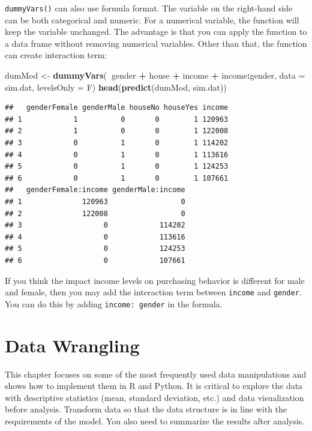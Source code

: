 \documentclass[12pt,]{krantz}
\makeatletter
\newenvironment{Shaded}{\begin{snugshade}}{\end{snugshade}}
\newcommand{\DataTypeTok}[1]{\textcolor[rgb]{0.27,0.27,0.27}{#1}}
\newcommand{\KeywordTok}[1]{\textcolor[rgb]{0.27,0.27,0.27}{\textbf{#1}}}
\newcommand{\NormalTok}[1]{#1}
\newcommand{\OperatorTok}[1]{\textcolor[rgb]{0.43,0.43,0.43}{\textbf{#1}}}
\newcommand{\StringTok}[1]{\textcolor[rgb]{0.5,0.5,0.5}{#1}}
\newenvironment{kframe}{%
\medskip{}
\setlength{\fboxsep}{.8em}
 \def\at@end@of@kframe{}%
 \ifinner\ifhmode%
  \def\at@end@of@kframe{\end{minipage}}%
  \begin{minipage}{\columnwidth}%
 \fi\fi%
 \def\FrameCommand##1{\hskip\@totalleftmargin \hskip-\fboxsep
 \colorbox{shadecolor}{##1}\hskip-\fboxsep
     \hskip-\linewidth \hskip-\@totalleftmargin \hskip\columnwidth}%
 \MakeFramed {\advance\hsize-\width
   \@totalleftmargin\z@ \linewidth\hsize
   \@setminipage}}%
 {\par\unskip\endMakeFramed%
 \at@end@of@kframe}
\renewenvironment{Shaded}{\begin{kframe}}{\end{kframe}}
\makeatother
\begin{document}
\texttt{dummyVars()} can also use formula format. The variable on the right-hand side can be both categorical and numeric. For a numerical variable, the function will keep the variable unchanged. The advantage is that you can apply the function to a data frame without removing numerical variables. Other than that, the function can create interaction term:

\begin{Shaded}
\begin{Highlighting}[]
\NormalTok{dumMod <-}\StringTok{ }\KeywordTok{dummyVars}\NormalTok{(}\OperatorTok{~}\NormalTok{gender }\OperatorTok{+}\StringTok{ }\NormalTok{house }\OperatorTok{+}\StringTok{ }\NormalTok{income }\OperatorTok{+}\StringTok{ }\NormalTok{income}\OperatorTok{:}\NormalTok{gender, }
                    \DataTypeTok{data =}\NormalTok{ sim.dat, }
                    \DataTypeTok{levelsOnly =}\NormalTok{ F)}
\KeywordTok{head}\NormalTok{(}\KeywordTok{predict}\NormalTok{(dumMod, sim.dat))}
\end{Highlighting}
\end{Shaded}

\begin{verbatim}
##   genderFemale genderMale houseNo houseYes income
## 1            1          0       0        1 120963
## 2            1          0       0        1 122008
## 3            0          1       0        1 114202
## 4            0          1       0        1 113616
## 5            0          1       0        1 124253
## 6            0          1       0        1 107661
##   genderFemale:income genderMale:income
## 1              120963                 0
## 2              122008                 0
## 3                   0            114202
## 4                   0            113616
## 5                   0            124253
## 6                   0            107661
\end{verbatim}

If you think the impact income levels on purchasing behavior is different for male and female, then you may add the interaction term between \texttt{income} and \texttt{gender}. You can do this by adding \texttt{income:\ gender} in the formula.

\hypertarget{data-wrangling}{%
\chapter{Data Wrangling}\label{data-wrangling}}

This chapter focuses on some of the most frequently used data manipulations and shows how to implement them in R and Python. It is critical to explore the data with descriptive statistics (mean, standard deviation, etc.) and data visualization before analysis. Transform data so that the data structure is in line with the requirements of the model. You also need to summarize the results after analysis.
\end{document}
